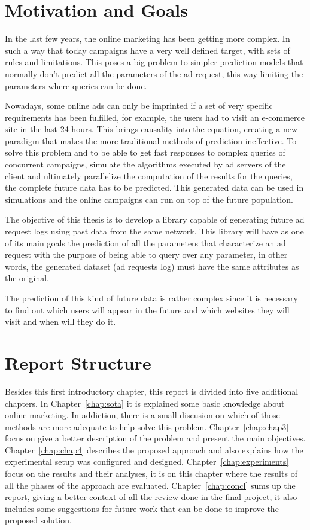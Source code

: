 \section{Motivation and Goals} \label{sec:goals}

In the last few years, the online marketing has been getting more complex. In
such a way that today campaigns have a very well defined target, with
sets of rules and limitations. This poses a big problem to
simpler prediction models that normally don't predict all the parameters of the
ad request, this way limiting the parameters where queries can be done.


Nowadays, some online ads can only be imprinted if a set of very specific requirements has been fulfilled, for example,
the users had to visit an e-commerce site in the last 24 hours. This brings causality into the equation, creating a new paradigm that makes 
the more traditional methods of prediction ineffective. To solve this problem
and to be able to get fast responses to complex queries of concurrent campaigns,
simulate the algorithms executed by ad servers of the client
and ultimately parallelize the computation of the results for the
queries,
the complete future data has to be predicted. This generated data
can be used in simulations and the online campaigns can run on top of the future population.

The objective of this thesis is to develop a library capable of generating
future ad request logs using past data from the same network.
This library will have as one of its main goals the prediction of all the parameters that characterize an
ad request with the purpose of being able to query over any parameter, in other
words, the generated dataset (ad requests log) must have the same attributes as the original.

The prediction of this kind of future data is rather complex since it is
necessary to find out which users will appear in the future and which websites they
will visit and when will they do it.

\section{Report Structure} \label{sec:struct}

Besides this first introductory chapter, this report is divided into five additional chapters.
In Chapter~\ref{chap:sota} it is explained some basic knowledge about online marketing. In addiction, there is
a small discusion on which of those methods are more adequate to help solve this problem.
Chapter~\ref{chap:chap3} focus on give a better description of the problem and
present the main objectives.
Chapter~\ref{chap:chap4} describes the proposed approach and also explains how
the experimental setup was configured and designed.
Chapter~\ref{chap:experiments} focus on the results and their analyses, it is on
this chapter where the results of all the phases of the approach are evaluated.
Chapter~\ref{chap:concl} sums up the report, giving a better context of all the
review done in the final project, it also includes some suggestions for future
work that can be done to improve the proposed solution.

